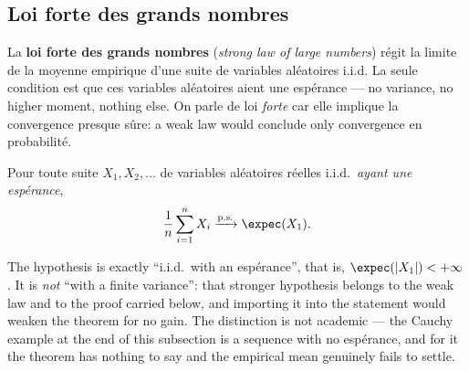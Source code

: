 \subsection{Loi forte des grands nombres}
La \textbf{loi forte des grands nombres} (\textit{strong law of large numbers})
régit la limite de la moyenne empirique d'une suite de variables aléatoires
i.i.d. La seule condition est que ces variables aléatoires aient une espérance
--- no variance, no higher moment, nothing else. On parle de loi \emph{forte}
car elle implique la convergence presque sûre: a weak law would conclude only
convergence en probabilité.

\begin{theorem}
  Pour toute suite $X_{1}, X_{2}, \dots$ de variables aléatoires réelles
  i.i.d.\ \emph{ayant une espérance},
  \[
    \frac{1}{n} \sum_{i=1}^{n} X_{i} \cvas \expec(X_{1}) .
  \]
\end{theorem}

\begin{remark}
  The hypothesis is exactly ``i.i.d.\ with an espérance'', that is,
  $\expec(|X_{1}|) < +\infty$. It is \emph{not} ``with a finite variance'': that
  stronger hypothesis belongs to the weak law and to the proof carried below,
  and importing it into the statement would weaken the theorem for no gain. The
  distinction is not academic --- the Cauchy example at the end of this
  subsection is a sequence with no espérance, and for it the theorem has
  nothing to say and the empirical mean genuinely fails to settle.
\end{remark}

